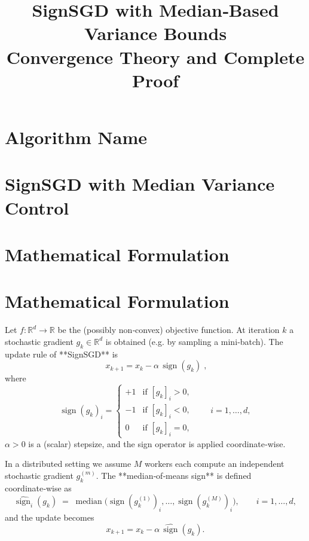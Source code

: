 \documentclass{article}
\newcommand{\sign}{\operatorname{sign}}
\newcommand{\R}{\mathbb{R}}
\begin{document}
\title{SignSGD with Median‑Based Variance Bounds\\
Convergence Theory and Complete Proof}
\author{}
\date{}
\maketitle

\tableofcontents

\newpage

\section*{Algorithm Name}
\section{SignSGD with Median Variance Control}

\section*{Mathematical Formulation}
\section{Mathematical Formulation}
Let $f:\R^{d}\rightarrow\R$ be the (possibly non‑convex) objective function.
At iteration $k$ a stochastic gradient $g_k\in\R^{d}$ is obtained
(e.g. by sampling a mini‑batch).  The update rule of **SignSGD** is
\[
\boxed{\;x_{k+1}=x_{k}-\alpha\,\sign(g_k)\;},
\tag{1}
\]
where
\[
\sign(g_k)_i = 
\begin{cases}
+1 & \text{if }[g_k]_i>0,\\[2pt]
-1 & \text{if }[g_k]_i<0,\\[2pt]
0 & \text{if }[g_k]_i=0,
\end{cases}
\qquad i=1,\dots,d,
\]
$\alpha>0$ is a (scalar) stepsize, and the sign operator is applied
coordinate‑wise.

In a distributed setting we assume $M$ workers each compute an
independent stochastic gradient $g_k^{(m)}$.
The **median‑of‑means sign** is defined coordinate‑wise as
\[
\widehat{\sign}_i(g_k)\;=\;\operatorname{median}\Big(\sign(g_k^{(1)})_i,\dots,
\sign(g_k^{(M)})_i\Big),\qquad i=1,\dots,d,
\]
and the update becomes
\[
x_{k+1}=x_k-\alpha\,\widehat{\sign}(g_k).
\tag{2}
\]
\end{document}
